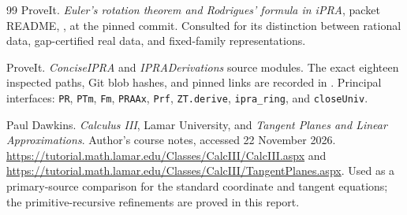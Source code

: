 \begin{thebibliography}{99}
ProveIt. \emph{Euler's rotation theorem and Rodrigues' formula in iPRA},
packet README, ,
at the pinned commit. Consulted for its distinction between rational data,
gap-certified real data, and fixed-family representations.

ProveIt. \emph{ConciseIPRA} and \emph{IPRADerivations} source modules.
The exact eighteen inspected paths, Git blob hashes, and pinned links are
recorded in . Principal interfaces:
\texttt{PR}, \texttt{PTm}, \texttt{Fm}, \texttt{PRAAx}, \texttt{Prf},
\texttt{ZT.derive}, \texttt{ipra\_ring}, and \texttt{closeUniv}.

Paul Dawkins. \emph{Calculus III}, Lamar University, and
\emph{Tangent Planes and Linear Approximations}. Author's course notes,
accessed 22 November 2026.
\url{https://tutorial.math.lamar.edu/Classes/CalcIII/CalcIII.aspx} and
\url{https://tutorial.math.lamar.edu/Classes/CalcIII/TangentPlanes.aspx}.
Used as a primary-source comparison for the standard coordinate and tangent
equations; the primitive-recursive refinements are proved in this report.
\end{thebibliography}
